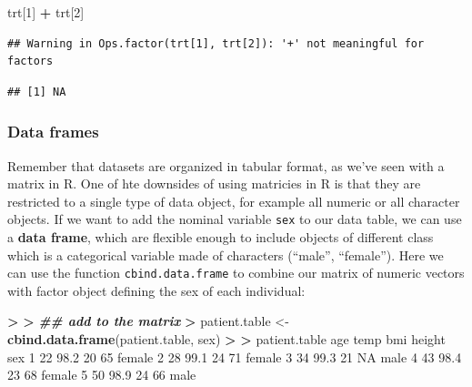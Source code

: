 \documentclass[
]{book}
\newenvironment{Shaded}{\begin{snugshade}}{\end{snugshade}}
\newcommand{\ConstantTok}[1]{\textcolor[rgb]{0.56,0.35,0.01}{#1}}
\newcommand{\DecValTok}[1]{\textcolor[rgb]{0.00,0.00,0.81}{#1}}
\newcommand{\DocumentationTok}[1]{\textcolor[rgb]{0.56,0.35,0.01}{\textbf{\textit{#1}}}}
\newcommand{\ErrorTok}[1]{\textcolor[rgb]{0.64,0.00,0.00}{\textbf{#1}}}
\newcommand{\FloatTok}[1]{\textcolor[rgb]{0.00,0.00,0.81}{#1}}
\newcommand{\FunctionTok}[1]{\textcolor[rgb]{0.13,0.29,0.53}{\textbf{#1}}}
\newcommand{\NormalTok}[1]{#1}
\newcommand{\OtherTok}[1]{\textcolor[rgb]{0.56,0.35,0.01}{#1}}
\newcommand{\SpecialCharTok}[1]{\textcolor[rgb]{0.81,0.36,0.00}{\textbf{#1}}}
\begin{document}
\begin{Shaded}
\begin{Highlighting}[]
\NormalTok{trt[}\DecValTok{1}\NormalTok{] }\SpecialCharTok{+}\NormalTok{ trt[}\DecValTok{2}\NormalTok{]}
\end{Highlighting}
\end{Shaded}

\begin{verbatim}
## Warning in Ops.factor(trt[1], trt[2]): '+' not meaningful for factors
\end{verbatim}

\begin{verbatim}
## [1] NA
\end{verbatim}

\subsubsection{Data frames}\label{data-frames}

Remember that datasets are organized in tabular format, as we've seen with a matrix in R. One of hte downsides of using matricies in R is that they are restricted to a single type of data object, for example all numeric or all character objects. If we want to add the nominal variable \texttt{sex} to our data table, we can use a \textbf{data frame}, which are flexible enough to include objects of different class which is a categorical variable made of characters (``male'', ``female''). Here we can use the function \texttt{cbind.data.frame} to combine our matrix of numeric vectors with factor object defining the sex of each individual:

\begin{Shaded}
\begin{Highlighting}[]
\SpecialCharTok{\textgreater{}} 
\ErrorTok{\textgreater{}} \DocumentationTok{\#\# add to the matrix}
\ErrorTok{\textgreater{}}\NormalTok{ patient.table }\OtherTok{\textless{}{-}} \FunctionTok{cbind.data.frame}\NormalTok{(patient.table, sex)}
\SpecialCharTok{\textgreater{}} 
\ErrorTok{\textgreater{}}\NormalTok{ patient.table}
\NormalTok{  age temp bmi height    sex}
\DecValTok{1}  \DecValTok{22} \FloatTok{98.2}  \DecValTok{20}     \DecValTok{65}\NormalTok{ female}
\DecValTok{2}  \DecValTok{28} \FloatTok{99.1}  \DecValTok{24}     \DecValTok{71}\NormalTok{ female}
\DecValTok{3}  \DecValTok{34} \FloatTok{99.3}  \DecValTok{21}     \ConstantTok{NA}\NormalTok{   male}
\DecValTok{4}  \DecValTok{43} \FloatTok{98.4}  \DecValTok{23}     \DecValTok{68}\NormalTok{ female}
\DecValTok{5}  \DecValTok{50} \FloatTok{98.9}  \DecValTok{24}     \DecValTok{66}\NormalTok{   male}
\end{Highlighting}
\end{Shaded}
\end{document}
